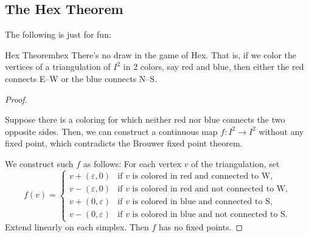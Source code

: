 \subsection{The Hex Theorem}

The following is just for fun:

\begin{theorem}{Hex Theorem}{hex}
    There's no draw in the game of Hex. That is, if we color the vertices of a triangulation of $I^2$ in 2 colors, say red and blue, then either the red connects E--W or the blue connects N--S.
\end{theorem}

\begin{proof}
    \begin{center}
    \end{center}

    Suppose there is a coloring for which neither red nor blue connects the two opposite sides. Then, we can construct a continuous map $f \colon I^2 \to I^2$ without any fixed point, which contradicts the Brouwer fixed point theorem.

    We construct such $f$ as follows: For each vertex $v$ of the triangulation, set
    \[
        f(v) = \begin{cases}
            v + (\varepsilon, 0) & \text{if } v \text{ is colored in red and connected to W}, \\
            v - (\varepsilon, 0) & \text{if } v \text{ is colored in red and not connected to W}, \\
            v + (0, \varepsilon) & \text{if } v \text{ is colored in blue and connected to S}, \\
            v - (0, \varepsilon) & \text{if } v \text{ is colored in blue and not connected to S}.
        \end{cases}
    \]
    Extend linearly on each simplex. Then $f$ has no fixed points.
\end{proof}
